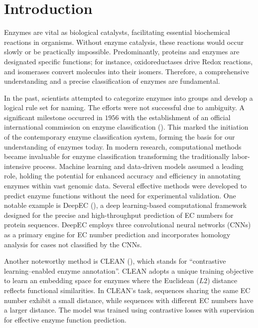 \documentclass{bioinfo}
\begin{document}
\section{Introduction}

Enzymes are vital as biological catalysts, facilitating essential biochemical reactions in organisms.
Without enzyme catalysis, these reactions would occur slowly or be practically impossible.
Predominantly, proteins and enzymes are designated specific functions; for instance, oxidoreductases drive Redox reactions, and isomerases convert molecules into their isomers.
Therefore, a comprehensive understanding and a precise classification of enzymes are fundamental.

In the past, scientists attempted to categorize enzymes into groups and develop a logical rule set for naming.
The efforts were not successful due to ambiguity.
A significant milestone occurred in $1956$ with the establishment of an official international commission on enzyme classification (\cite{International_Union_of_Biochemistry_and_Molecular_Biology_Nomenclature_Committee1993-ey}). 
This marked the initiation of the contemporary enzyme classification system, forming the basis for our understanding of enzymes today.
In modern research, computational methods became invaluable for enzyme classification transforming the traditionally labor-intensive process.
Machine learning and data-driven models assumed a leading role, holding the potential for enhanced 
accuracy and efficiency in annotating enzymes within vast genomic data.
Several effective methods were developed to predict enzyme functions without the need for experimental validation.
One notable example is DeepEC (\cite{DeepEC}), a deep learning-based computational framework designed for the precise and high-throughput prediction of EC numbers for protein sequences.
DeepEC employs three convolutional neural networks (CNNs) as a primary engine for EC number prediction and incorporates homology analysis for cases not classified by the CNNs.

Another noteworthy method is CLEAN (\cite{CleanArticle}), which stands for ``contrastive learning–enabled 
enzyme annotation''. CLEAN adopts a unique training objective to learn an embedding space for enzymes where the Euclidean ($L2$) distance 
reflects functional similarities. In CLEAN's task, sequences sharing the same EC number exhibit a small distance, while sequences 
with different EC numbers have a larger distance. The model was trained using contrastive losses with supervision for effective 
enzyme function prediction.
\end{document}
